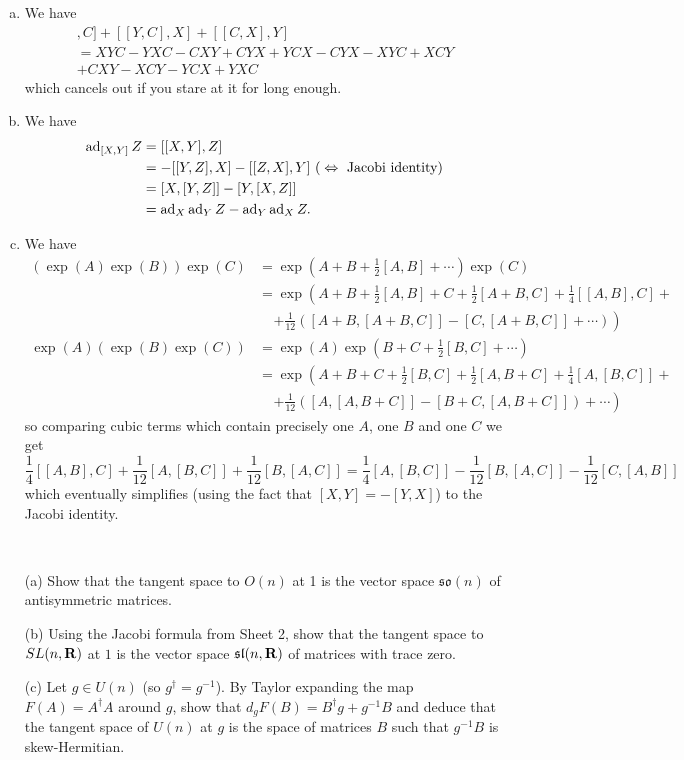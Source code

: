 \documentclass[12pt]{article}
\begin{document}
\begin{answer}
\begin{enumerate}[(a)]
\item We have
\begin{gather*}
[X,Y],C]+[[Y,C],X]+[[C,X],Y]\\
=XYC-YXC-CXY+CYX+YCX-CYX-XYC+XCY\\
+CXY-XCY-YCX+YXC
\end{gather*}
which cancels out if you stare at it for long enough.
\item We have
\begin{align*}
\operatorname{ad}_{[X,Y]}Z&=[[X,Y],Z]\\
           &=-[[Y,Z],X]-[[Z,X],Y]\mbox{ (}\Leftrightarrow\mbox{ Jacobi identity)}\\
           &=[X,[Y,Z]]-[Y,[X,Z]]\\
           &=\operatorname{ad}_X\operatorname{ad}_YZ-\operatorname{ad}_Y\operatorname{ad}_XZ.
\end{align*}
\item We have
  \begin{align*}
    (\exp(A)\exp(B))\exp(C)&=\exp(A+B+\frac{1}{2}[A,B]+\cdots)\exp(C)\\
    &=\exp\left(A+B+\frac{1}{2}[A,B]+C+\frac{1}{2}[A+B,C]+\frac{1}{4}[[A,B],C]+\right.\\
    &\ \ \ \ \ \left.+\frac{1}{12}([A+B,[A+B,C]]-[C,[A+B,C]]+\cdots)\right)\\
    \exp(A)(\exp(B)\exp(C))&=\exp(A)\exp(B+C+\frac{1}{2}[B,C]+\cdots)\\
    &=\exp\left(A+B+C+\frac{1}{2}[B,C]+\frac{1}{2}[A,B+C]+\frac{1}{4}[A,[B,C]]+\right.\\
    &\ \ \ \ \ \left.+\frac{1}{12}([A,[A,B+C]]-[B+C,[A,B+C]])+\cdots\right)
  \end{align*}
  so comparing cubic terms which contain precisely one $A$, one $B$ and one $C$ we get
  \[\frac{1}{4}[[A,B],C]+\frac{1}{12}[A,[B,C]]+\frac{1}{12}[B,[A,C]]=\frac{1}{4}[A,[B,C]]-\frac{1}{12}[B,[A,C]]-\frac{1}{12}[C,[A,B]]\]
  which eventually simplifies (using the fact that $[X,Y]=-[Y,X]$) to the Jacobi identity.
\end{enumerate}
\end{answer}
\newpage

\bigskip

\begin{question}\ \\
\begin{enumerate}
\item[(a)] Show that the tangent space to $O(n)$ at 1 is the vector space $\mathfrak{so}(n)$ of antisymmetric matrices.
\item[(b)] Using the Jacobi formula from Sheet 2, show that the tangent space to $SL(n,\mathbf{R})$ at $1$ is the vector space $\mathfrak{sl}(n,\mathbf{R})$ of matrices with trace zero.
\item[(c)] Let $g\in U(n)$ (so $g^{\dagger}=g^{-1}$). By Taylor expanding the map $F(A)=A^{\dagger}A$ around $g$, show that $d_gF(B)=B^{\dagger}g+g^{-1}B$ and deduce that the tangent space of $U(n)$ at $g$ is the space of matrices $B$ such that $g^{-1}B$ is skew-Hermitian.
\end{enumerate}
\end{question}
\end{document}
